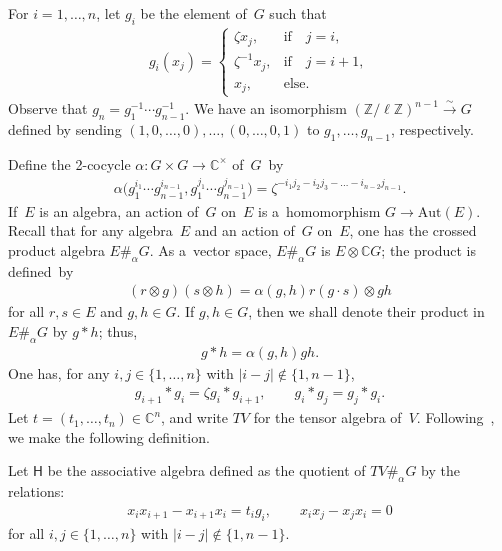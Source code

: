 For $i=1,\dots, n$, let $g_i$ be the element of~$G$ such that
\begin{gather*}
g_i (x_j) =
\begin{cases}
\zeta x_j, & \text{if} \quad j=i,
\\
\zeta^{-1} x_j, & \text{if} \quad j=i+1,
\\
x_j, & \mbox {else}.
\end{cases}
\end{gather*}
Observe that $g_n=g_1^{-1}\cdots g_{n-1}^{-1}$.
We have an isomorphism $({\mathbb{Z}}/\ell{\mathbb{Z}})^{n-1} \overset{\sim}{\longrightarrow} G$ def\/ined by sending
$(1,0,\dots,0),\ldots, (0,\ldots, 0,1)$ to $g_1,\dots, g_{n-1}$, respectively.

Def\/ine the 2-cocycle $\alpha: G\times G\to {\mathbb{C}}^\times$ of~$G$~by
\begin{gather*}
\alpha\big(g_1^{i_1} \cdots g_{n-1}^{i_{n-1}}, g_1^{j_1} \cdots g_{n-1}^{j_{n-1}}\big) = \zeta^{-i_1j_2-i_2j_3-\dots -
i_{n-2}j_{n-1}}.
\end{gather*}
If~$E$ is an algebra, an action of~$G$ on~$E$ is a~homomorphism $G\to \mathrm{Aut}(E)$.
Recall that for any algebra~$E$ and an action of~$G$ on~$E$, one has the crossed product algebra $E\#_\alpha G$.
As a~vector space, $E\#_\alpha G$ is $E\otimes{\mathbb{C}} G$; the product is def\/ined~by
\begin{gather*}
(r\otimes g)(s\otimes h) = \alpha (g,h) r (g\cdot s) \otimes gh
\end{gather*}
for all $r,s \in E$ and $g,h\in G$.
If $g, h\in G$, then we shall denote their product in $E\#_\alpha G$ by $g*h$; thus,
\begin{gather*}
g* h = \alpha(g,h) gh.
\end{gather*}
One has, for any $i, j \in \{1,\ldots,n\}$ with $|i-j|\notin\{1, n-1\}$,
\begin{gather*}
g_{i+1}*g_i = \zeta g_i * g_{i+1},
\qquad
g_i *g_j = g_j *g_i.
\end{gather*}
Let $t=(t_1,\dots, t_n)\in {\mathbb{C}}^n$, and write $TV$ for the tensor algebra of~$V$.
Following~\cite[Examp\-le~2.16]{W}, we make the following def\/inition.

\begin{Definition}
\label{hhh}
Let $\mathsf{H}$ be the associative algebra def\/ined as the quotient of $TV\#_\alpha G$ by the relations:
\begin{gather*}
x_ix_{i+1}- x_{i+1} x_i = t_i g_i,
\qquad
x_ix_j - x_jx_i = 0
\end{gather*}
for all $i, j \in \{1,\ldots,n\}$ with $|i-j|\notin\{1, n-1\}$.
\end{Definition}

